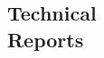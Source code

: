 \documentclass[margin,line]{resume}
\begin{document}
\begin{resume}

    \section{\mysidestyle Technical\\Reports}
    \begin{bibenum}
       \item {}
    \end{bibenum}

\end{resume}
\end{document}
